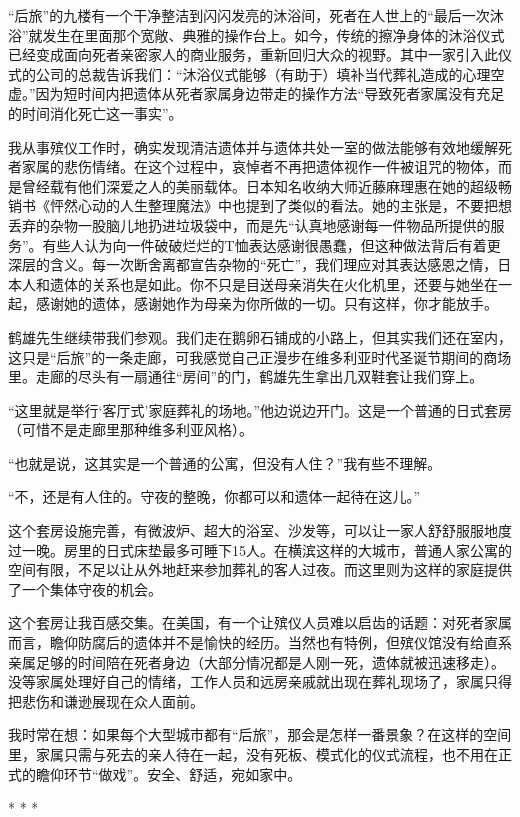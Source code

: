 \documentclass[12pt,oneside]{book}
\begin{document}
\begin{bookref}[frametitle={\cite{好好告别}}]
“后旅”的九楼有一个干净整洁到闪闪发亮的沐浴间，死者在人世上的“最后一次沐浴”就发生在里面那个宽敞、典雅的操作台上。如今，传统的擦净身体的沐浴仪式已经变成面向死者亲密家人的商业服务，重新回归大众的视野。其中一家引入此仪式的公司的总裁告诉我们：“沐浴仪式能够（有助于）填补当代葬礼造成的心理空虚。”因为短时间内把遗体从死者家属身边带走的操作方法“导致死者家属没有充足的时间消化死亡这一事实”。

我从事殡仪工作时，确实发现清洁遗体并与遗体共处一室的做法能够有效地缓解死者家属的悲伤情绪。在这个过程中，哀悼者不再把遗体视作一件被诅咒的物体，而是曾经载有他们深爱之人的美丽载体。日本知名收纳大师近藤麻理惠在她的超级畅销书《怦然心动的人生整理魔法》中也提到了类似的看法。她的主张是，不要把想丢弃的杂物一股脑儿地扔进垃圾袋中，而是先“认真地感谢每一件物品所提供的服务”。有些人认为向一件破破烂烂的T恤表达感谢很愚蠢，但这种做法背后有着更深层的含义。每一次断舍离都宣告杂物的“死亡”，我们理应对其表达感恩之情，日本人和遗体的关系也是如此。你不只是目送母亲消失在火化机里，还要与她坐在一起，感谢她的遗体，感谢她作为母亲为你所做的一切。只有这样，你才能放手。

鹤雄先生继续带我们参观。我们走在鹅卵石铺成的小路上，但其实我们还在室内，这只是“后旅”的一条走廊，可我感觉自己正漫步在维多利亚时代圣诞节期间的商场里。走廊的尽头有一扇通往“房间”的门，鹤雄先生拿出几双鞋套让我们穿上。

“这里就是举行‘客厅式’家庭葬礼的场地。”他边说边开门。这是一个普通的日式套房（可惜不是走廊里那种维多利亚风格）。

“也就是说，这其实是一个普通的公寓，但没有人住？”我有些不理解。

“不，还是有人住的。守夜的整晚，你都可以和遗体一起待在这儿。”

这个套房设施完善，有微波炉、超大的浴室、沙发等，可以让一家人舒舒服服地度过一晚。房里的日式床垫最多可睡下15人。在横滨这样的大城市，普通人家公寓的空间有限，不足以让从外地赶来参加葬礼的客人过夜。而这里则为这样的家庭提供了一个集体守夜的机会。

这个套房让我百感交集。在美国，有一个让殡仪人员难以启齿的话题：对死者家属而言，瞻仰防腐后的遗体并不是愉快的经历。当然也有特例，但殡仪馆没有给直系亲属足够的时间陪在死者身边（大部分情况都是人刚一死，遗体就被迅速移走）。没等家属处理好自己的情绪，工作人员和远房亲戚就出现在葬礼现场了，家属只得把悲伤和谦逊展现在众人面前。

我时常在想：如果每个大型城市都有“后旅”，那会是怎样一番景象？在这样的空间里，家属只需与死去的亲人待在一起，没有死板、模式化的仪式流程，也不用在正式的瞻仰环节“做戏”。安全、舒适，宛如家中。
\begin{center}
* * *
\end{center}


\end{bookref}
\end{document}
